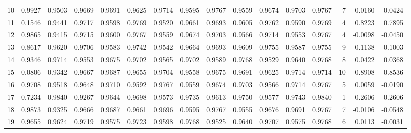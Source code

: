 \begin{tabular}{lrrrrrrrrrrrrrrr}
10 &      0.9927 &  0.9503 &  0.9669 &  0.9691 &  0.9625 &  0.9714 &  0.9595 &  0.9767 &  0.9559 &  0.9674 &   0.9703 &     0.9767 &      7 &                   -0.0160 &                    -0.0424 \\
11 &      0.1546 &  0.9441 &  0.9717 &  0.9598 &  0.9769 &  0.9520 &  0.9661 &  0.9693 &  0.9605 &  0.9762 &   0.9590 &     0.9769 &      4 &                    0.8223 &                     0.7895 \\
12 &      0.9865 &  0.9415 &  0.9715 &  0.9600 &  0.9767 &  0.9559 &  0.9674 &  0.9703 &  0.9566 &  0.9714 &   0.9553 &     0.9767 &      4 &                   -0.0098 &                    -0.0450 \\
13 &      0.8617 &  0.9620 &  0.9706 &  0.9583 &  0.9742 &  0.9542 &  0.9664 &  0.9693 &  0.9609 &  0.9755 &   0.9587 &     0.9755 &      9 &                    0.1138 &                     0.1003 \\
14 &      0.9346 &  0.9714 &  0.9553 &  0.9675 &  0.9702 &  0.9565 &  0.9702 &  0.9589 &  0.9768 &  0.9529 &   0.9640 &     0.9768 &      8 &                    0.0422 &                     0.0368 \\
15 &      0.0806 &  0.9342 &  0.9667 &  0.9687 &  0.9655 &  0.9704 &  0.9558 &  0.9675 &  0.9691 &  0.9625 &   0.9714 &     0.9714 &     10 &                    0.8908 &                     0.8536 \\
16 &      0.9708 &  0.9518 &  0.9648 &  0.9710 &  0.9592 &  0.9767 &  0.9559 &  0.9674 &  0.9703 &  0.9566 &   0.9714 &     0.9767 &      5 &                    0.0059 &                    -0.0190 \\
17 &      0.7234 &  0.9840 &  0.9267 &  0.9644 &  0.9698 &  0.9573 &  0.9735 &  0.9613 &  0.9750 &  0.9577 &   0.9743 &     0.9840 &      1 &                    0.2606 &                     0.2606 \\
18 &      0.9873 &  0.9325 &  0.9666 &  0.9687 &  0.9661 &  0.9696 &  0.9595 &  0.9767 &  0.9555 &  0.9676 &   0.9691 &     0.9767 &      7 &                   -0.0106 &                    -0.0548 \\
19 &      0.9655 &  0.9624 &  0.9719 &  0.9575 &  0.9723 &  0.9598 &  0.9768 &  0.9525 &  0.9640 &  0.9707 &   0.9575 &     0.9768 &      6 &                    0.0113 &                    -0.0031 \\
\bottomrule
\end{tabular}
